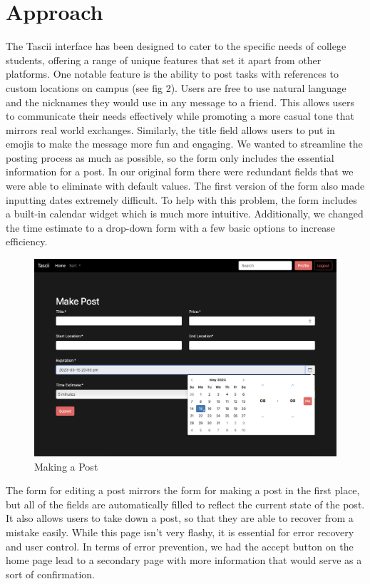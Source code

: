 \section{Approach}

The Tascii interface has been designed to cater to the specific needs of college students, offering a range of unique features that set it apart from other platforms. One notable feature is the ability to post tasks with references to custom locations on campus (see fig 2). Users are free to use natural language and the nicknames they would use in any message to a friend. This allows users to communicate their needs effectively while promoting a more casual tone that mirrors real world exchanges. Similarly, the title field allows users to put in emojis to make the message more fun and engaging. We wanted to streamline the posting process as much as possible, so the form only includes the essential information for a post. In our original form there were redundant fields that we were able to eliminate with default values. The first version of the form also made inputting dates extremely difficult. To help with this problem, the form includes a built-in calendar widget which is much more intuitive. Additionally, we changed the time estimate to a drop-down form with a few basic options to increase efficiency.

\begin{figure}[ht]
        \centering
        \caption{Making a Post}
        \includegraphics[width=1\textwidth]{images/Make Post.png}
        
        \label{fig:bird1}
    \end{figure}

The form for editing a post mirrors the form for making a post in the first place, but all of the fields are automatically filled to reflect the current state of the post. It also allows users to take down a post, so that they are able to recover from a mistake easily. While this page isn't very flashy, it is essential for error recovery and user control. In terms of error prevention, we had the accept button on the home page lead to a secondary page with more information that would serve as a sort of confirmation.

